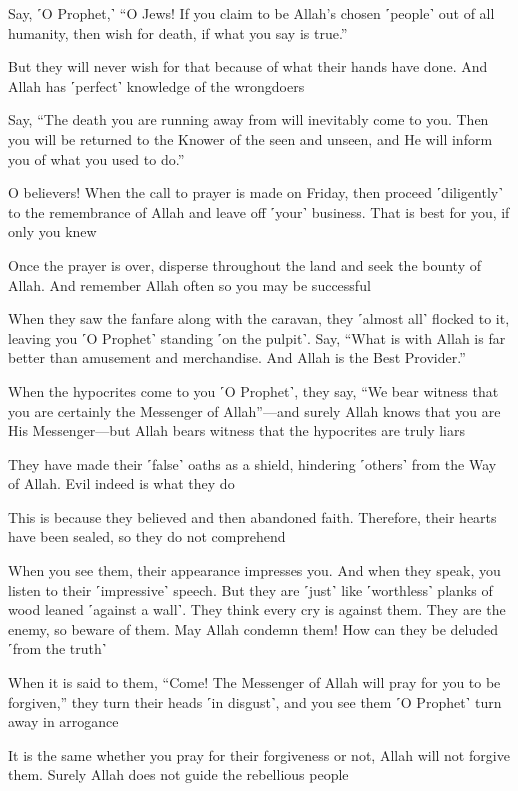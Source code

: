 Say, ˹O Prophet,˺ “O Jews! If you claim to be Allah’s chosen ˹people˺ out of all humanity, then wish for death, if what you say is true.”

But they will never wish for that because of what their hands have done. And Allah has ˹perfect˺ knowledge of the wrongdoers

Say, “The death you are running away from will inevitably come to you. Then you will be returned to the Knower of the seen and unseen, and He will inform you of what you used to do.”

O believers! When the call to prayer is made on Friday, then proceed ˹diligently˺ to the remembrance of Allah and leave off ˹your˺ business. That is best for you, if only you knew

Once the prayer is over, disperse throughout the land and seek the bounty of Allah. And remember Allah often so you may be successful

When they saw the fanfare along with the caravan, they ˹almost all˺ flocked to it, leaving you ˹O Prophet˺ standing ˹on the pulpit˺. Say, “What is with Allah is far better than amusement and merchandise. And Allah is the Best Provider.”

When the hypocrites come to you ˹O Prophet˺, they say, “We bear witness that you are certainly the Messenger of Allah”—and surely Allah knows that you are His Messenger—but Allah bears witness that the hypocrites are truly liars

They have made their ˹false˺ oaths as a shield, hindering ˹others˺ from the Way of Allah. Evil indeed is what they do

This is because they believed and then abandoned faith. Therefore, their hearts have been sealed, so they do not comprehend

When you see them, their appearance impresses you. And when they speak, you listen to their ˹impressive˺ speech. But they are ˹just˺ like ˹worthless˺ planks of wood leaned ˹against a wall˺. They think every cry is against them. They are the enemy, so beware of them. May Allah condemn them! How can they be deluded ˹from the truth˺

When it is said to them, “Come! The Messenger of Allah will pray for you to be forgiven,” they turn their heads ˹in disgust˺, and you see them ˹O Prophet˺ turn away in arrogance

It is the same whether you pray for their forgiveness or not, Allah will not forgive them. Surely Allah does not guide the rebellious people

